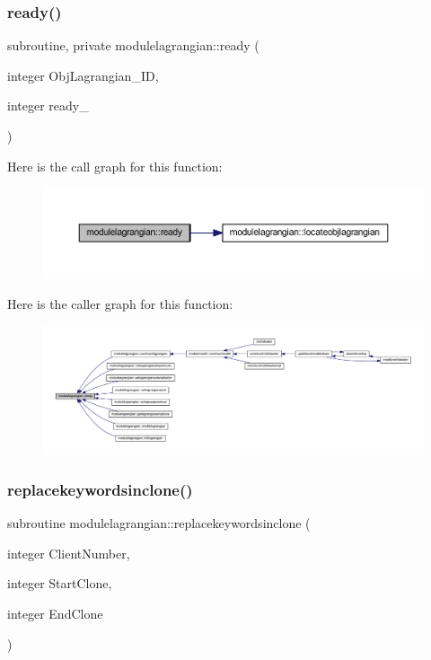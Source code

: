 \subsubsection{\texorpdfstring{ready()}{ready()}}
{\footnotesize\ttfamily subroutine, private modulelagrangian\+::ready (\begin{DoxyParamCaption}\item[{integer}]{Obj\+Lagrangian\+\_\+\+ID,  }\item[{integer}]{ready\+\_\+ }\end{DoxyParamCaption})\hspace{0.3cm}{\ttfamily [private]}}

Here is the call graph for this function\+:\nopagebreak
\begin{figure}[H]
\begin{center}
\leavevmode
\includegraphics[width=350pt]{namespacemodulelagrangian_a4ddfbe58c1df4477f8d84db54b330823_cgraph}
\end{center}
\end{figure}
Here is the caller graph for this function\+:\nopagebreak
\begin{figure}[H]
\begin{center}
\leavevmode
\includegraphics[width=350pt]{namespacemodulelagrangian_a4ddfbe58c1df4477f8d84db54b330823_icgraph}
\end{center}
\end{figure}
\mbox{\label{namespacemodulelagrangian_a6f0ed297af020601a6d8ac70faef5cae}} 
\subsubsection{\texorpdfstring{replacekeywordsinclone()}{replacekeywordsinclone()}}
{\footnotesize\ttfamily subroutine modulelagrangian\+::replacekeywordsinclone (\begin{DoxyParamCaption}\item[{integer}]{Client\+Number,  }\item[{integer}]{Start\+Clone,  }\item[{integer}]{End\+Clone }\end{DoxyParamCaption})\hspace{0.3cm}{\ttfamily [private]}}

